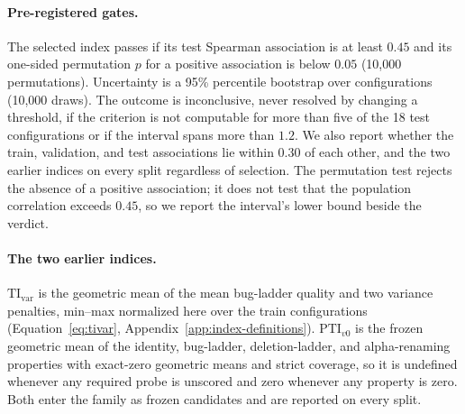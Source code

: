 \paragraph{Pre-registered gates.}
The selected index passes if its test Spearman association is at least $0.45$ and its one-sided permutation $p$ for a positive association is below $0.05$ (10{,}000 permutations).
Uncertainty is a 95\% percentile bootstrap over configurations (10{,}000 draws).
The outcome is inconclusive, never resolved by changing a threshold, if the criterion is not computable for more than five of the 18 test configurations or if the interval spans more than $1.2$.
We also report whether the train, validation, and test associations lie within $0.30$ of each other, and the two earlier indices on every split regardless of selection.
The permutation test rejects the absence of a positive association; it does not test that the population correlation exceeds $0.45$, so we report the interval's lower bound beside the verdict.

\paragraph{The two earlier indices.}
$\mathrm{TI}_{\mathrm{var}}$ is the geometric mean of the mean bug-ladder quality and two variance penalties, min--max normalized here over the train configurations (Equation~\ref{eq:tivar}, Appendix~\ref{app:index-definitions}).
$\mathrm{PTI}_{v0}$ is the frozen geometric mean of the identity, bug-ladder, deletion-ladder, and alpha-renaming properties with exact-zero geometric means and strict coverage, so it is undefined whenever any required probe is unscored and zero whenever any property is zero.
Both enter the family as frozen candidates and are reported on every split.

